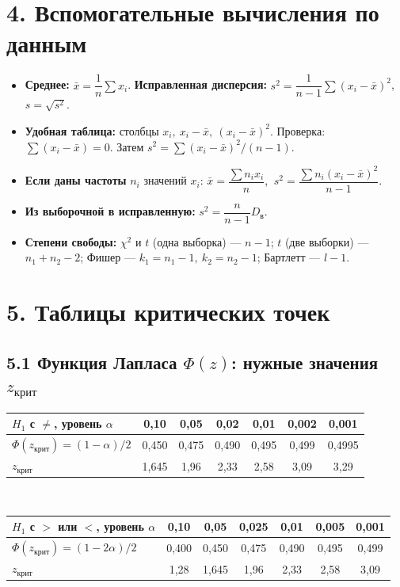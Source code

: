 \documentclass[a4paper,10pt]{extarticle}
\newcommand{\kr}{\text{крит}}\newcommand{\nab}{\text{набл}}
\begin{document}
\section*{4. Вспомогательные вычисления по данным}
\begin{itemize}
\item \textbf{Среднее:} $\bar x=\dfrac{1}{n}\sum x_i$. \quad \textbf{Исправленная дисперсия:} $s^2=\dfrac{1}{n-1}\sum (x_i-\bar x)^2$, \quad $s=\sqrt{s^2}$.
\item \textbf{Удобная таблица:} столбцы $x_i,\ x_i-\bar x,\ (x_i-\bar x)^2$. Проверка: $\sum(x_i-\bar x)=0$. Затем $s^2=\sum(x_i-\bar x)^2/(n-1)$.
\item \textbf{Если даны частоты} $n_i$ значений $x_i$: $\bar x=\dfrac{\sum n_ix_i}{n}$, $\ s^2=\dfrac{\sum n_i(x_i-\bar x)^2}{n-1}$.
\item \textbf{Из выборочной в исправленную:} $s^2=\dfrac{n}{n-1}D_{\text{в}}$.
\item \textbf{Степени свободы:} $\chi^2$ и $t$ (одна выборка) --- $n-1$; $t$ (две выборки) --- $n_1+n_2-2$; Фишер --- $k_1=n_1-1,\ k_2=n_2-1$; Бартлетт --- $l-1$.
\end{itemize}

\section*{5. Таблицы критических точек}
\subsection*{5.1 Функция Лапласа $\Phi(z)$: нужные значения $z_\kr$}
\renewcommand{\arraystretch}{1.2}
\noindent\begin{tabular}{@{}l|cccccc@{}}
$H_1$ с $\ne$, уровень $\alpha$ & 0,10 & 0,05 & 0,02 & 0,01 & 0,002 & 0,001 \\\hline
$\Phi(z_\kr)=(1-\alpha)/2$ & 0,450 & 0,475 & 0,490 & 0,495 & 0,499 & 0,4995 \\
$z_\kr$ & 1,645 & 1,96 & 2,33 & 2,58 & 3,09 & 3,29 \\
\end{tabular}\\[3pt]
\begin{tabular}{@{}l|cccccc@{}}
$H_1$ с $>$ или $<$, уровень $\alpha$ & 0,10 & 0,05 & 0,025 & 0,01 & 0,005 & 0,001 \\\hline
$\Phi(z_\kr)=(1-2\alpha)/2$ & 0,400 & 0,450 & 0,475 & 0,490 & 0,495 & 0,499 \\
$z_\kr$ & 1,28 & 1,645 & 1,96 & 2,33 & 2,58 & 3,09 \\
\end{tabular}
\end{document}
